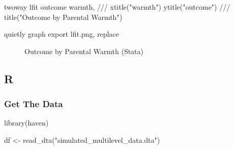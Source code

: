 \documentclass[
  letterpaper,
  DIV=11,
  numbers=noendperiod]{scrreprt}
\newenvironment{Shaded}{\begin{snugshade}}{\end{snugshade}}
\newcommand{\BaseNTok}[1]{\textcolor[rgb]{0.68,0.00,0.00}{#1}}
\newcommand{\CommentTok}[1]{\textcolor[rgb]{0.37,0.37,0.37}{#1}}
\newcommand{\FunctionTok}[1]{\textcolor[rgb]{0.28,0.35,0.67}{#1}}
\newcommand{\KeywordTok}[1]{\textcolor[rgb]{0.00,0.23,0.31}{#1}}
\newcommand{\NormalTok}[1]{\textcolor[rgb]{0.00,0.23,0.31}{#1}}
\newcommand{\OtherTok}[1]{\textcolor[rgb]{0.00,0.23,0.31}{#1}}
\newcommand{\StringTok}[1]{\textcolor[rgb]{0.13,0.47,0.30}{#1}}
\begin{document}
\begin{Shaded}
\begin{Highlighting}[]
\KeywordTok{twoway} \KeywordTok{lfit}\NormalTok{ outcome warmth, }\CommentTok{///}
  \BaseNTok{xtitle}\NormalTok{(}\StringTok{"warmth"}\NormalTok{) }\BaseNTok{ytitle}\NormalTok{(}\StringTok{"outcome"}\NormalTok{) }\CommentTok{///}
  \BaseNTok{title}\NormalTok{(}\StringTok{"Outcome by Parental Warmth"}\NormalTok{) }

\KeywordTok{quietly} \KeywordTok{graph} \KeywordTok{export} \KeywordTok{lfit}\NormalTok{.png, }\KeywordTok{replace}
\end{Highlighting}
\end{Shaded}

\begin{figure}


\caption{\label{fig-Statalfit}Outcome by Parental Warmth (Stata)}

\end{figure}%

\subsection{R}

\subsubsection{Get The Data}\label{get-the-data-4}

\begin{Shaded}
\begin{Highlighting}[]
\FunctionTok{library}\NormalTok{(haven)}

\NormalTok{df }\OtherTok{\textless{}{-}} \FunctionTok{read\_dta}\NormalTok{(}\StringTok{"simulated\_multilevel\_data.dta"}\NormalTok{)}
\end{Highlighting}
\end{Shaded}
\end{document}
